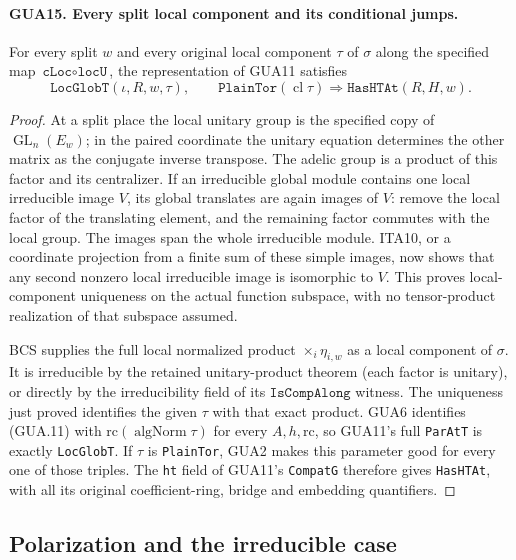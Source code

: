 \paragraph{GUA15. Every split local component and its conditional jumps.}
\label{claim:GUA15}
For every split $w$ and every original local component
$\tau$ of $\sigma$ along the specified map
$\texttt{cLoc}\circ\texttt{locU}$, the representation
of GUA11 satisfies
\[
       \texttt{LocGlobT}(\iota,R,w,\tau),\qquad
       \texttt{PlainTor}(\operatorname{cl}\tau)
                        \Longrightarrow\texttt{HasHTAt}(R,H,w).
                                                        \tag{GUA.21}
\]
\begin{proof}
At a split place the local unitary group is the
specified copy of $\operatorname{GL}_n(E_w)$; in
the paired coordinate the unitary equation determines
the other matrix as the conjugate inverse transpose.
The adelic group is a product of this factor and
its centralizer.  If an irreducible global module
contains one local irreducible image $V$, its global
translates are again images of $V$: remove the local
factor of the translating element, and the remaining
factor commutes with the local group.  The images
span the whole irreducible module.  ITA10, or a
coordinate projection from a finite sum of these
simple images, now shows that any second nonzero
local irreducible image is isomorphic to $V$.
This proves local-component uniqueness on the actual
function subspace, with no tensor-product realization
of that subspace assumed.

BCS supplies the full local normalized product
$\mathop{\times}_i\eta_{i,w}$ as a local component
of $\sigma$.  It is irreducible by the retained
unitary-product theorem (each factor is unitary),
or directly by the irreducibility field of its
$\texttt{IsCompAlong}$ witness.  The uniqueness just
proved identifies the given $\tau$ with that exact
product.  GUA6 identifies (GUA.11) with
$\mathrm{rc}(\operatorname{algNorm}\tau)$ for
every $A,h,\mathrm{rc}$, so GUA11's full
\texttt{ParAtT} is exactly \texttt{LocGlobT}.
If $\tau$ is \texttt{PlainTor}, GUA2 makes this
parameter good for every one of those triples.
The \texttt{ht} field of GUA11's \texttt{CompatG}
therefore gives \texttt{HasHTAt}, with all its
original coefficient-ring, bridge and embedding quantifiers.
\end{proof}

\subsection{Polarization and the irreducible case}

